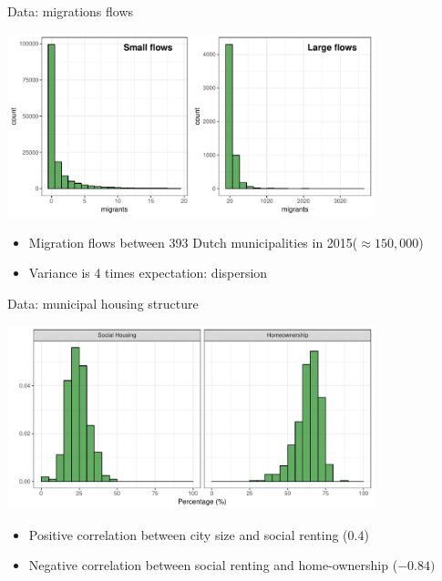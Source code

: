 \documentclass{beamer}
\begin{document}
\begin{frame}{Data: migrations flows}
	\begin{center}
		\includegraphics[width=0.8\textwidth]{../fig/hist_mig}      
	\end{center}
\begin{itemize}
	\item Migration flows \alert{between} 393 Dutch municipalities in 2015($\approx 150,000$)
	\item Variance is 4 times expectation: \alert{dispersion}
\end{itemize}
\end{frame}

\begin{frame}{Data: municipal housing structure}
\begin{center}
	\includegraphics[width=0.8\textwidth]{../fig/hist_housing}      
\end{center}
\begin{itemize}
	\item Positive correlation between city size and social renting ($0.4$)
	\item Negative correlation between social renting and home-ownership ($-0.84)$
\end{itemize}
\end{frame}
\end{document}
